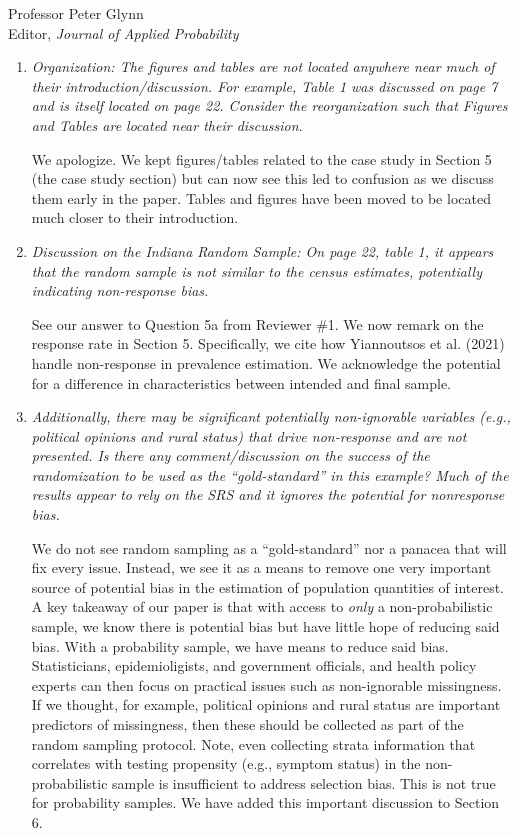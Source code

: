 \documentclass[11pt]{letter} %
\begin{document}
\begin{letter}{Professor
	Peter Glynn\\
	Editor, {\em Journal of Applied Probability}}
\begin{enumerate}
\begin{enumerate}
	\item {\it Organization: The figures and tables are not located anywhere near much of their introduction/discussion. For example, Table 1 was discussed on page 7 and is itself located on page 22. Consider the reorganization such that Figures and Tables are located near their discussion.}
	\vspace{5mm}

	We apologize.  We kept figures/tables related to the case study in Section 5 (the case study section) but can now see this led to confusion as we discuss them early in the paper. Tables and figures have been moved to be located much closer to their introduction.
	\vspace{5mm}

	\item {\it Discussion on the Indiana Random Sample: On page 22, table 1, it appears that the random sample is not similar to the census estimates, potentially indicating non-response bias.}
	\vspace{5mm}

    See our answer to Question 5a from Reviewer \#1. We now remark on the response rate in Section 5.  Specifically, we cite how Yiannoutsos et al. (2021) handle non-response in prevalence estimation.  We acknowledge the potential for a difference in characteristics between intended and final sample.
    \vspace{5mm}


	\item {\it Additionally, there may be significant potentially non-ignorable variables (e.g., political opinions and rural status) that drive non-response and are not presented. Is there any comment/discussion on the success of the randomization to be used as the “gold-standard” in this example? Much of the results appear to rely on the SRS and it ignores the potential for nonresponse bias.}
	\vspace{5mm}

	We do not see random sampling as a ``gold-standard'' nor a panacea that will fix every issue.  Instead, we see it as a means to remove one very important source of potential bias in the estimation of population quantities of interest.  A key takeaway of our paper is that with access to \emph{only} a non-probabilistic sample, we know there is potential bias but have little hope of reducing said bias.  With a probability sample, we have means to reduce said bias.  Statisticians, epidemioligists, and government officials, and health policy experts can then focus on practical issues such as non-ignorable missingness.  If we thought, for example, political opinions and rural status are important predictors of missingness, then these should be collected as part of the random sampling protocol.  Note, even collecting strata information that correlates with testing propensity (e.g., symptom status) in the non-probabilistic sample is insufficient to address selection bias.  This is not true for probability samples.  We have added this important discussion to Section 6.
\end{enumerate}


\end{enumerate}
\end{letter}
\end{document}

